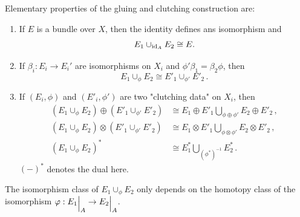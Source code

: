 \begin{corollary}\label{cor: Elementary Properties of the Gluing and Clutching Construction}
	Elementary properties of the gluing and clutching construction are:
	\begin{enumerate}
		\item If $E$ is a bundle over $X$, then the identity defines ans isomorphism and 
		\begin{equation*}
			E_1 \cup_{\operatorname{\mathrm{id}}_A}E_2 \cong E.
		\end{equation*}
		\item If $\beta_i:E_i \to E_i'$ are isomorphisms on $X_i$ and $\phi' \beta_1=\beta_2\phi$, then  
		\begin{equation*}
			E_1\cup_{\phi}E_2 \cong E'_1\cup_{\phi'}E'_2 \, .
		\end{equation*}
		\item If $(E_i,\phi)$ and $(E'_i,\phi')$ are two "clutching data" on $X_i$, then 
		\begin{align*}
			(E_1 \cup _{\phi}E_2)\oplus (E'_1 \cup _{\phi'}E'_2)&\cong E_1\oplus E'_1 \bigcup_{\phi \oplus \phi'}E_2\oplus E'_2 \, ,\\
			(E_1 \cup _{\phi}E_2)\otimes (E'_1 \cup_{\phi'}E'_2)&\cong E_1\otimes E'_1 \bigcup_{\phi \otimes \phi'}E_2\otimes E'_2 \, ,\\
			(E_1 \cup _{\phi}E_2)^* &\cong E^*_1\bigcup_{(\phi^*)^{-1}}E^*_2 \, .
		\end{align*} $(-)^*$ denotes the dual here.
	\end{enumerate}
\end{corollary}
\begin{lemma}\label{lem: Clutching is unique up to homotopy}
	The isomorphism class of $E_1 \cup_{\phi}E_2$ only depends on the homotopy class of the isomorphism $\phi: {E_1}\einsch{A}\to {E_2}\einsch{A}$.
\end{lemma}
